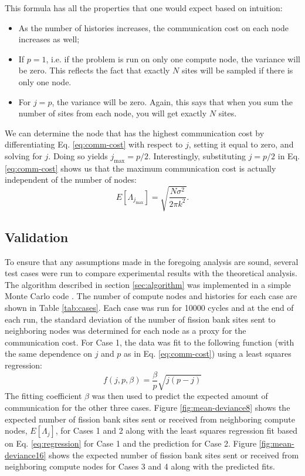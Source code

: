 \documentclass[11pt]{article}
\begin{document}
This formula has all the properties that one would expect based on
intuition:
\begin{itemize}
\item As the number of histories increases, the communication cost on
  each node increases as well;
\item If $p=1$, i.e. if the problem is run on only one compute node,
  the variance will be zero. This reflects the fact that exactly $N$
  sites will be sampled if there is only one node.
\item For $j=p$, the variance will be zero. Again, this says that when
  you sum the number of sites from each node, you will get exactly $N$
  sites.
\end{itemize}
We can determine the node that has the highest communication cost by
differentiating Eq. \ref{eq:comm-cost} with respect to $j$, setting it
equal to zero, and solving for $j$. Doing so yields $j_{\text{max}} =
p/2$. Interestingly, substituting $j = p/2$ in Eq. \ref{eq:comm-cost}
shows us that the maximum communication cost is actually independent
of the number of nodes:
\begin{equation}
  E \left [ \Lambda_{j_{\text{max}}} \right ] = \sqrt{
    \frac{N\sigma^2}{2\pi k^2}}.
\end{equation}

\subsection{Validation}

To ensure that any assumptions made in the foregoing analysis are
sound, several test cases were run to compare experimental results
with the theoretical analysis. The algorithm described in section
\ref{sec:algorithm} was implemented in a simple Monte Carlo code
\cite{romano-LANL}. The number of compute nodes and histories for each
case are shown in Table \ref{tab:cases}.  Each case was run for 10000
cycles and at the end of each run, the standard deviation of the
number of fission bank sites sent to neighboring nodes was determined
for each node as a proxy for the communication cost. For Case 1, the
data was fit to the following function (with the same dependence on
$j$ and $p$ as in Eq. \ref{eq:comm-cost}) using a least squares
regression:
\begin{equation}\label{eq:regression}
  f(j,p,\beta) = \frac{\beta}{p} \sqrt{j(p-j)}
\end{equation}
The fitting coefficient $\beta$ was then used to predict the expected
amount of communication for the other three cases. Figure
\ref{fig:mean-deviance8} shows the expected number of fission bank
sites sent or received from neighboring compute nodes, $E \left [
  \Lambda_j \right ]$, for Cases 1 and 2 along with the least squares
regression fit based on Eq. \ref{eq:regression} for Case 1 and the
prediction for Case 2. Figure \ref{fig:mean-deviance16} shows the
expected number of fission bank sites sent or received from
neighboring compute nodes for Cases 3 and 4 along with the predicted
fits.
\end{document}
